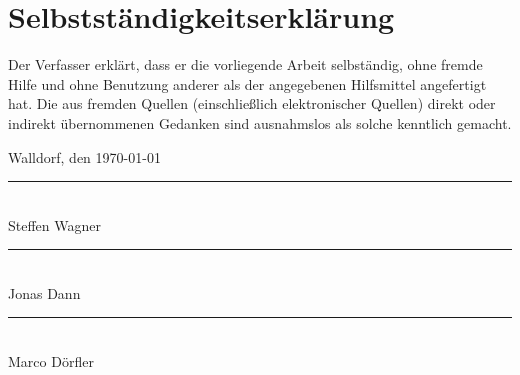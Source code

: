 \thispagestyle{empty}
\section*{Selbstständigkeitserklärung}
\vspace{15mm}
 
Der Verfasser erklärt, dass er die vorliegende Arbeit selbständig, 
ohne fremde Hilfe und ohne Benutzung anderer als der angegebenen Hilfsmittel
angefertigt hat. 
Die aus fremden Quellen (einschließlich elektronischer Quellen) direkt oder 
indirekt übernommenen Gedanken sind ausnahmslos als solche kenntlich gemacht. 
 
\vspace{3cm} 
Walldorf, den \today
\vspace{1cm} 	
\begin{multicols}{3}
	\vspace{2cm}
	\rule{5cm}{.1pt}\\
	\vspace{5mm}
	Steffen Wagner
	
	\rule{5cm}{.1pt}\\
	\vspace{5mm}
	Jonas Dann

	\rule{5cm}{.1pt}\\
	\vspace{5mm}
	Marco Dörfler
\end{multicols}

\vspace{5cm}